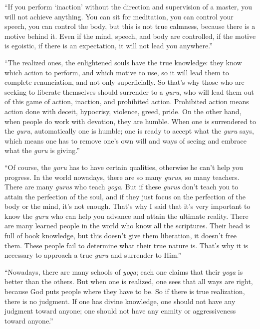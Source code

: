 \enquote{If you perform \enquote{inaction} without the direction and supervision of a master, you will not achieve anything. You can sit for meditation, you can control your speech, you can control the body, but this is not true calmness, because there is a motive behind it. Even if the mind, speech, and body are controlled, if the motive is egoistic, if there is an expectation, it will not lead you anywhere.}

\enquote{The realized ones, the enlightened souls have the true knowledge: they know which action to perform, and which motive to use, so it will lead them to complete renunciation, and not only superficially. So that’s why those who are seeking to liberate themselves should surrender to a \textit{guru}, who will lead them out of this game of action, inaction, and prohibited action. Prohibited action means action done with deceit, hypocrisy, violence, greed, pride. On the other hand, when people do work with devotion, they are humble. When one is surrendered to the \textit{guru}, automatically one is humble; one is ready to accept what the \textit{guru} says, which means one has to remove one’s own will and ways of seeing and embrace what the \textit{guru} is giving.}

\enquote{Of course, the \textit{guru} has to have certain qualities, otherwise he can’t help you progress. In the world nowadays, there are so many \textit{gurus}, so many teachers. There are many \textit{gurus} who teach \textit{yoga}. But if these \textit{gurus} don’t teach you to attain the perfection of the soul, and if they just focus on the perfection of the body or the mind, it’s not enough. That’s why I said that it’s very important to know the \textit{guru} who can help you advance and attain the ultimate reality. There are many learned people in the world who know all the scriptures. Their head is full of book knowledge, but this doesn’t give them liberation, it doesn’t free them. These people fail to determine what their true nature is. That’s why it is necessary to approach a true \textit{guru} and surrender to Him.}

\enquote{Nowadays, there are many schools of \textit{yoga}; each one claims that their \textit{yoga} is better than the others. But when one is realized, one sees that all ways are right, because God puts people where they have to be. So if there is true realization, there is no judgment. If one has divine knowledge, one should not have any judgment toward anyone; one should not have any enmity or aggressiveness toward anyone.}

